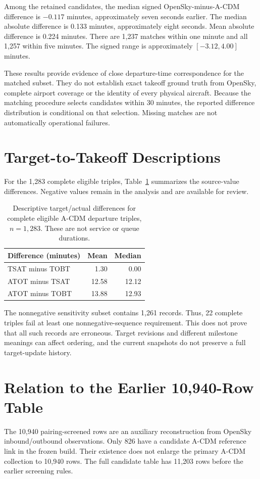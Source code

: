 Among the retained candidates, the median signed OpenSky-minus-A-CDM difference is $-0.117$ minutes, approximately seven seconds earlier. The median absolute difference is 0.133 minutes, approximately eight seconds. Mean absolute difference is 0.224 minutes. There are 1,237 matches within one minute and all 1,257 within five minutes. The signed range is approximately $[-3.12,4.00]$ minutes.

These results provide evidence of close departure-time correspondence for the matched subset. They do not establish exact takeoff ground truth from OpenSky, complete airport coverage or the identity of every physical aircraft. Because the matching procedure selects candidates within 30 minutes, the reported difference distribution is conditional on that selection. Missing matches are not automatically operational failures.

\section{Target-to-Takeoff Descriptions}
For the 1,283 complete eligible triples, Table~\ref{tab:acdmmetrics} summarizes the source-value differences. Negative values remain in the analysis and are available for review.
\begin{table}[htbp]\centering\small
\begin{tabular}{lrr}\hline
Difference (minutes) & Mean & Median\\\hline
TSAT minus TOBT & 1.30 & 0.00\\
ATOT minus TSAT & 12.58 & 12.12\\
ATOT minus TOBT & 13.88 & 12.93\\\hline
\end{tabular}
\caption{Descriptive target/actual differences for complete eligible A-CDM departure triples, $n=1,283$. These are not service or queue durations.}\label{tab:acdmmetrics}
\end{table}
The nonnegative sensitivity subset contains 1,261 records. Thus, 22 complete triples fail at least one nonnegative-sequence requirement. This does not prove that all such records are erroneous. Target revisions and different milestone meanings can affect ordering, and the current snapshots do not preserve a full target-update history.

\section{Relation to the Earlier 10,940-Row Table}
The 10,940 pairing-screened rows are an auxiliary reconstruction from OpenSky inbound/outbound observations. Only 826 have a candidate A-CDM reference link in the frozen build. Their existence does not enlarge the primary A-CDM collection to 10,940 rows. The full candidate table has 11,203 rows before the earlier screening rules.

